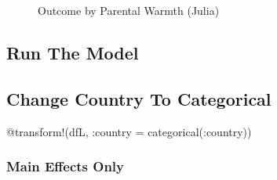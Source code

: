 \documentclass[
  letterpaper,
  DIV=11,
  numbers=noendperiod]{scrreprt}
\newenvironment{Shaded}{\begin{snugshade}}{\end{snugshade}}
\newcommand{\FunctionTok}[1]{\textcolor[rgb]{0.28,0.35,0.67}{#1}}
\newcommand{\NormalTok}[1]{\textcolor[rgb]{0.00,0.23,0.31}{#1}}
\newcommand{\OperatorTok}[1]{\textcolor[rgb]{0.37,0.37,0.37}{#1}}
\newcommand{\PreprocessorTok}[1]{\textcolor[rgb]{0.68,0.00,0.00}{#1}}
\begin{document}
\begin{figure}[H]


\caption{\label{fig-Julialongitudinal}Outcome by Parental Warmth
(Julia)}

\end{figure}%

\subsection{Run The Model}\label{run-the-model-5}

\subsection{Change Country To
Categorical}\label{change-country-to-categorical-1}

\begin{Shaded}
\begin{Highlighting}[]
\PreprocessorTok{@transform}\NormalTok{!(dfL, }\OperatorTok{:}\NormalTok{country }\OperatorTok{=} \FunctionTok{categorical}\NormalTok{(}\OperatorTok{:}\NormalTok{country))}
\end{Highlighting}
\end{Shaded}

\subsubsection{Main Effects Only}\label{main-effects-only-2}
\end{document}

